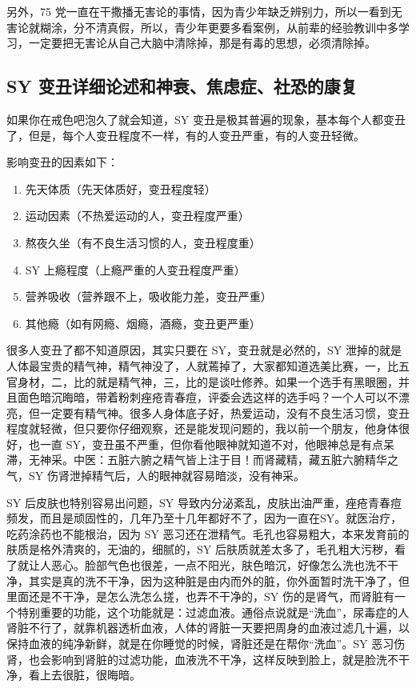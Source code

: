 \documentclass[fontset=founder]{ctexart}
\begin{document}
另外，75 党一直在干撒播无害论的事情，因为青少年缺乏辨别力，所以一看到无害论就糊涂，分不清真假，所以，青少年更要多看案例，从前辈的经验教训中多学习，一定要把无害论从自己大脑中清除掉，那是有毒的思想，必须清除掉。

\subsection{SY 变丑详细论述和神衰、焦虑症、社恐的康复}

如果你在戒色吧泡久了就会知道，SY 变丑是极其普遍的现象，基本每个人都变丑了，但是，每个人变丑程度不一样，有的人变丑严重，有的人变丑轻微。

影响变丑的因素如下：

\begin{enumerate}
    \item 先天体质（先天体质好，变丑程度轻）
    \item 运动因素（不热爱运动的人，变丑程度严重）
    \item 熬夜久坐（有不良生活习惯的人，变丑程度重）
    \item SY 上瘾程度（上瘾严重的人变丑程度严重）
    \item 营养吸收（营养跟不上，吸收能力差，变丑严重）
    \item 其他瘾（如有网瘾、烟瘾，酒瘾，变丑更严重）
\end{enumerate}

很多人变丑了都不知道原因，其实只要在 SY，变丑就是必然的，SY 泄掉的就是人体最宝贵的精气神，精气神没了，人就蔫掉了，大家都知道选美比赛，一，比五官身材，二，比的就是精气神，三，比的是谈吐修养。如果一个选手有黑眼圈，并且面色暗沉晦暗，带着粉刺痤疮青春痘，评委会选这样的选手吗？一个人可以不漂亮，但一定要有精气神。很多人身体底子好，热爱运动，没有不良生活习惯，变丑程度就轻微，但只要你仔细观察，还是能发现问题的，我以前一个朋友，他身体很好，也一直 SY，变丑虽不严重，但你看他眼神就知道不对，他眼神总是有点呆滞，无神采。中医：五脏六腑之精气皆上注于目！而肾藏精，藏五脏六腑精华之气，SY 伤肾泄掉精气后，人的眼神就容易暗淡，没有神采。

SY 后皮肤也特别容易出问题，SY 导致内分泌紊乱，皮肤出油严重，痤疮青春痘频发，而且是顽固性的，几年乃至十几年都好不了，因为一直在SY。就医治疗，吃药涂药也不能根治，因为 SY 恶习还在泄精气。毛孔也容易粗大，本来发育前的肤质是格外清爽的，无油的，细腻的，SY 后肤质就差太多了，毛孔粗大污秽，看了就让人恶心。脸部气色也很差，一点不阳光，肤色暗沉，好像怎么洗也洗不干净，其实是真的洗不干净，因为这种脏是由内而外的脏，你外面暂时洗干净了，但里面还是不干净，是怎么洗怎么搓，也弄不干净的，SY 伤的是肾气，而肾脏有一个特别重要的功能，这个功能就是：过滤血液。通俗点说就是“洗血”，尿毒症的人肾脏不行了，就靠机器透析血液，人体的肾脏一天要把周身的血液过滤几十遍，以保持血液的纯净新鲜，就是在你睡觉的时候，肾脏还是在帮你“洗血”。SY 恶习伤肾，也会影响到肾脏的过滤功能，血液洗不干净，这样反映到脸上，就是脸洗不干净，看上去很脏，很晦暗。
\end{document}
